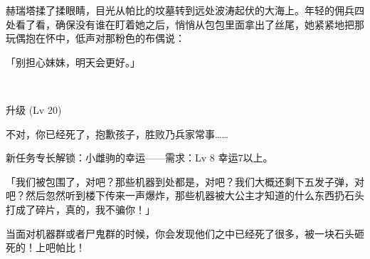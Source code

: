 赫瑞塔揉了揉眼睛，目光从帕比的坟墓转到远处波涛起伏的大海上。年轻的佣兵四处看了看，确保没有谁在盯着她之后，悄悄从包包里面拿出了丝尾，她紧紧地把那玩偶抱在怀中，低声对那粉色的布偶说：

「别担心妹妹，明天会更好。」

~\vfill

\begin{note}
    升级 (Lv 20) 

    不对，你已经死了，抱歉孩子，胜败乃兵家常事……

    新任务专长解锁：小雌驹的幸运——需求：Lv 8 幸运7以上。

    「我们被包围了，对吧？那些机器到处都是，对吧？我们大概还剩下五发子弹，对吧？然后忽然听到楼下传来一声爆炸，那些机器被大公主才知道的什么东西扔石头打成了碎片，真的，我不骗你！」

    当面对机器群或者尸鬼群的时候，你会发现他们之中已经死了很多，被一块石头砸死的！上吧帕比！
\end{note}




